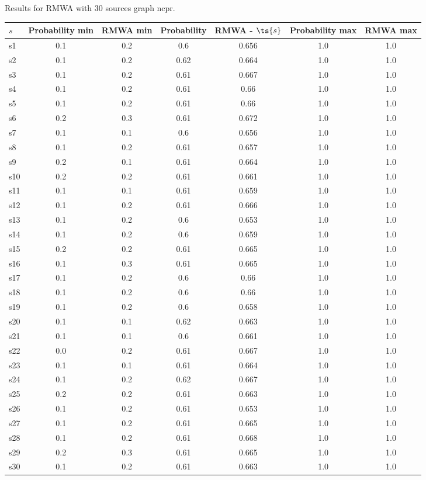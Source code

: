 \documentclass{article}
\begin{document}
\noindent Results for RMWA with 30 sources graph ncpr.

\noindent\begin{tabular}{|l|c|c|c|c|c|c|}
\hline
$s$& Probability min & RMWA min & Probability & RMWA - $\ts{s}$ & Probability max & RMWA max\\
\hline
s1 &0.1 & 0.2 & 0.6 & 0.656 & 1.0 & 1.0\\
\hline
s2 &0.1 & 0.2 & 0.62 & 0.664 & 1.0 & 1.0\\
\hline
s3 &0.1 & 0.2 & 0.61 & 0.667 & 1.0 & 1.0\\
\hline
s4 &0.1 & 0.2 & 0.61 & 0.66 & 1.0 & 1.0\\
\hline
s5 &0.1 & 0.2 & 0.61 & 0.66 & 1.0 & 1.0\\
\hline
s6 &0.2 & 0.3 & 0.61 & 0.672 & 1.0 & 1.0\\
\hline
s7 &0.1 & 0.1 & 0.6 & 0.656 & 1.0 & 1.0\\
\hline
s8 &0.1 & 0.2 & 0.61 & 0.657 & 1.0 & 1.0\\
\hline
s9 &0.2 & 0.1 & 0.61 & 0.664 & 1.0 & 1.0\\
\hline
s10 &0.2 & 0.2 & 0.61 & 0.661 & 1.0 & 1.0\\
\hline
s11 &0.1 & 0.1 & 0.61 & 0.659 & 1.0 & 1.0\\
\hline
s12 &0.1 & 0.2 & 0.61 & 0.666 & 1.0 & 1.0\\
\hline
s13 &0.1 & 0.2 & 0.6 & 0.653 & 1.0 & 1.0\\
\hline
s14 &0.1 & 0.2 & 0.6 & 0.659 & 1.0 & 1.0\\
\hline
s15 &0.2 & 0.2 & 0.61 & 0.665 & 1.0 & 1.0\\
\hline
s16 &0.1 & 0.3 & 0.61 & 0.665 & 1.0 & 1.0\\
\hline
s17 &0.1 & 0.2 & 0.6 & 0.66 & 1.0 & 1.0\\
\hline
s18 &0.1 & 0.2 & 0.6 & 0.66 & 1.0 & 1.0\\
\hline
s19 &0.1 & 0.2 & 0.6 & 0.658 & 1.0 & 1.0\\
\hline
s20 &0.1 & 0.1 & 0.62 & 0.663 & 1.0 & 1.0\\
\hline
s21 &0.1 & 0.1 & 0.6 & 0.661 & 1.0 & 1.0\\
\hline
s22 &0.0 & 0.2 & 0.61 & 0.667 & 1.0 & 1.0\\
\hline
s23 &0.1 & 0.1 & 0.61 & 0.664 & 1.0 & 1.0\\
\hline
s24 &0.1 & 0.2 & 0.62 & 0.667 & 1.0 & 1.0\\
\hline
s25 &0.2 & 0.2 & 0.61 & 0.663 & 1.0 & 1.0\\
\hline
s26 &0.1 & 0.2 & 0.61 & 0.653 & 1.0 & 1.0\\
\hline
s27 &0.1 & 0.2 & 0.61 & 0.665 & 1.0 & 1.0\\
\hline
s28 &0.1 & 0.2 & 0.61 & 0.668 & 1.0 & 1.0\\
\hline
s29 &0.2 & 0.3 & 0.61 & 0.665 & 1.0 & 1.0\\
\hline
s30 &0.1 & 0.2 & 0.61 & 0.663 & 1.0 & 1.0\\
\hline
\end{tabular}\\
\end{document}
